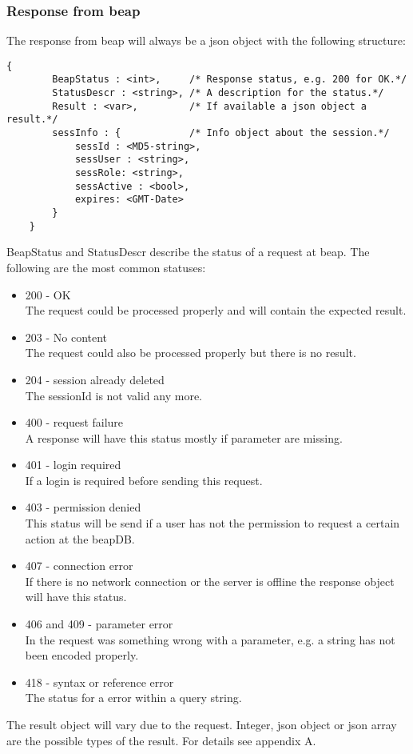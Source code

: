\documentclass[12pt,a4paper,oneside]{report}
\begin{document}
\subsubsection{Response from beap}
The response from beap will always be a json object with the following structure: 
\lstset{language=JavaScript}
\begin{lstlisting}[caption=Json object for beap response]
{
		BeapStatus : <int>, 	/* Response status, e.g. 200 for OK.*/
		StatusDescr : <string>, /* A description for the status.*/
		Result : <var>,         /* If available a json object a result.*/
		sessInfo : {			/* Info object about the session.*/
			sessId : <MD5-string>,
			sessUser : <string>,
			sessRole: <string>,
			sessActive : <bool>,
			expires: <GMT-Date>  
		}
	}
\end{lstlisting}
\label{beapResponse}
\lstset{language=java}
BeapStatus and StatusDescr describe the status of a request at beap. The following are the most common statuses:
\begin{itemize}
\item{200 - OK}
\\The request could be processed properly and will contain the expected result.
\item{203 - No content}
\\The request could also be processed properly but there is no result.
\item{204 - session already deleted}
\\The sessionId is not valid any more.
\item{400 - request failure}
\\A response will have this status mostly if parameter are missing.
\item{401 - login required}
\\If a login is required before sending this request.
\item{403 - permission denied}
\\This status will be send if a user has not the permission to request a certain action at the beapDB.
\item{407 - connection error}
\\If there is no network connection or the server is offline the response object will have this status.
\item{406 and 409 - parameter error}
\\In the request was something wrong with a parameter, e.g. a string has not been encoded properly.
\item{418 - syntax or reference error}
\\The status for a error within a query string.
\end{itemize}
The result object will vary due to the request. Integer, json object or json array are the possible types of the result. 
For details see appendix A.
\end{document}
